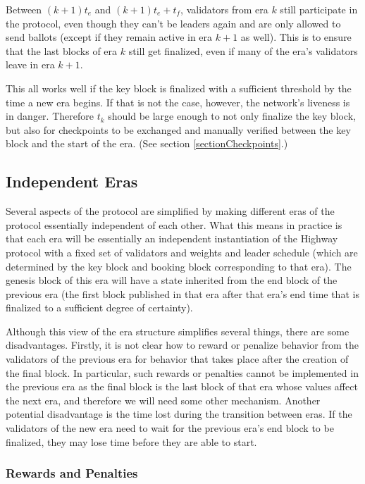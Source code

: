 \documentclass[12pt, fleqn]{article}
\begin{document}
Between $(k + 1) t_e$ and $(k + 1) t_e + t_f$, validators from era $k$ still participate in the protocol, even though they can't be leaders again and are only allowed to send ballots (except if they remain active in era $k + 1$ as well). This is to ensure that the last blocks of era $k$ still get finalized, even if many of the era's validators leave in era $k + 1$.

This all works well if the key block is finalized with a sufficient threshold by the time a new era begins. If that is not the case, however, the network's liveness is in danger. Therefore $t_k$ should be large enough to not only finalize the key block, but also for checkpoints to be exchanged and manually verified between the key block and the start of the era. (See section \ref{sectionCheckpoints}.)

\subsection{Independent Eras}

Several aspects of the protocol are simplified by making different eras of the protocol essentially independent of each other. What this means in practice is that each era will be essentially an independent instantiation of the Highway protocol with a fixed set of validators and weights and leader schedule (which are determined by the key block and booking block corresponding to that era). The genesis block of this era will have a state inherited from the end block of the previous era (the first block published in that era after that era's end time that is finalized to a sufficient degree of certainty).

Although this view of the era structure simplifies several things, there are some disadvantages. Firstly, it is not clear how to reward or penalize behavior from the validators of the previous era for behavior that takes place after the creation of the final block. In particular, such rewards or penalties cannot be implemented in the previous era as the final block is the last block of that era whose values affect the next era, and therefore we will need some other mechanism. Another potential disadvantage is the time lost during the transition between eras. If the validators of the new era need to wait for the previous era's end block to be finalized, they may lose time before they are able to start.

\subsubsection{Rewards and Penalties}
\end{document}
